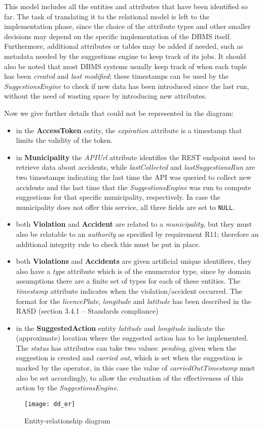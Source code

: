 This model includes all the entities and attributes that have been identified
so far.
The task of translating it to the relational model is left to the implementation
phase, since the choice of the attribute types and other smaller decisions
may depend on the specific implementation of the DBMS itself.
Furthermore, additional attributes or tables may be added if needed, such
as metadata needed by the suggestions engine to keep track of its jobs.
It should also be noted that most DBMS systems usually keep track of when each
tuple has been \emph{created} and \emph{last modified}; these timestamps
can be used by the \emph{SuggestionsEngine} to check if new data has been
introduced since the last run, without the need of wasting space by introducing
new attributes.

\noindent
Now we give further details that could not be represented in the diagram:
\begin{itemize}
    \item in the \textbf{AccessToken} entity, the \emph{expiration} attribute
    is a timestamp that limits the validity of the token.
    \item in \textbf{Municipality} the \emph{APIUrl} attribute identifies the
    REST endpoint used to retrieve data about accidents, while
    \emph{lastCollected} and \emph{lastSuggestionsRun} are two timestamps
    indicating the last time the API was queried to collect new accidents and
    the last time that the \emph{SuggestionsEngine} was run to compute
    suggestions for that specific municipality, respectively.
    In case the municipality does not offer this service, all three fields are
    set to \texttt{NULL}.
    \item both \textbf{Violation} and \textbf{Accident} are related to a
    \emph{municipality}, but they must also be relatable to an \emph{authority}
    as specified by requirement R11; therefore an additional integrity rule to
    check this must be put in place.
    \item both \textbf{Violations} and \textbf{Accidents} are given artificial
    unique identifiers, they also have a \emph{type} attribute which is of the
    enumerator type, since by domain assumptions there are a finite set of types
    for each of these entities. The \emph{timestamp} attribute indicates when
    the violation/accident occurred. The format for the \emph{licencePlate},
    \emph{longitude} and \emph{latitude} has been described in the RASD
    (section 3.4.1 -- Standards compliance)
    \item in the \textbf{SuggestedAction} entity \emph{latitude} and
    \emph{longitude} indicate the (approximate) location where the suggested
    action has to be implemented. The \emph{status} has attributes can take
    two values: \emph{pending}, given when the suggestion is created and
    \emph{carried out}, which is set when the suggestion is marked by the
    operator, in this case the value of \emph{carriedOutTimestamp} must also
    be set accordingly, to allow the evaluation of the effectiveness of this
    action by the \emph{SuggestionsEngine}.
\end{itemize}

\begin{figure}[ht]
    \centering
    \texttt{[image: dd\_er]}
    \caption{Entity-relationship diagram}
    \label{fig:er_diagram}
\end{figure}


